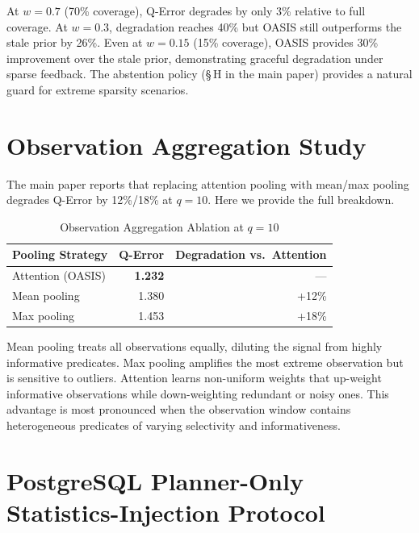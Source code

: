 \documentclass[runningheads]{llncs}
\begin{document}
At $w{=}0.7$ (70\% coverage), Q-Error degrades by only 3\% relative to full
coverage. At $w{=}0.3$, degradation reaches 40\% but OASIS still outperforms
the stale prior by 26\%. Even at $w{=}0.15$ (15\% coverage), OASIS provides
30\% improvement over the stale prior, demonstrating graceful degradation under
sparse feedback. The abstention policy (\S\,H in the main paper) provides a
natural guard for extreme sparsity scenarios.

\section{Observation Aggregation Study}
\label{sec:aggregation-app}

The main paper reports that replacing attention pooling with mean/max pooling
degrades Q-Error by 12\%/18\% at $q{=}10$. Here we provide the full breakdown.

\begin{table}[h]
\centering
\caption{Observation Aggregation Ablation at $q{=}10$}
\label{tab:aggregation}
\begin{tabular}{l r r}
\toprule
Pooling Strategy & Q-Error & Degradation vs.\ Attention \\
\midrule
Attention (OASIS) & \textbf{1.232} & --- \\
Mean pooling       & 1.380 & +12\% \\
Max pooling        & 1.453 & +18\% \\
\bottomrule
\end{tabular}
\end{table}

Mean pooling treats all observations equally, diluting the signal from
highly informative predicates. Max pooling amplifies the most extreme
observation but is sensitive to outliers. Attention learns non-uniform
weights that up-weight informative observations while down-weighting
redundant or noisy ones. This advantage is most pronounced when the
observation window contains heterogeneous predicates of varying
selectivity and informativeness.

\section{PostgreSQL Planner-Only Statistics-Injection Protocol}
\label{sec:optimizer-protocol-app}
\end{document}

